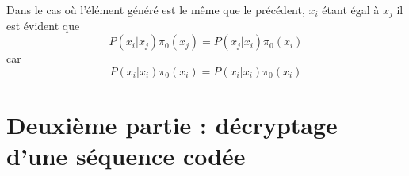 \documentclass[11pt]{report}
\begin{document}
Dans le cas où l'élément généré est le même que le précédent, $x_i$ étant égal à $x_j$ il est évident que 
$$P(x_i | x_j) \pi_0(x_j) = P(x_j | x_i) \pi_0(x_i)$$
car 
$$P(x_i | x_i) \pi_0(x_i) = P(x_i | x_i) \pi_0(x_i)$$
\section{Deuxième partie : décryptage d’une séquence codée}
\subsubsection{}
\subsubsection{}
\subsubsection{}
\subsubsection{}
\subsubsection{}
\end{document}
